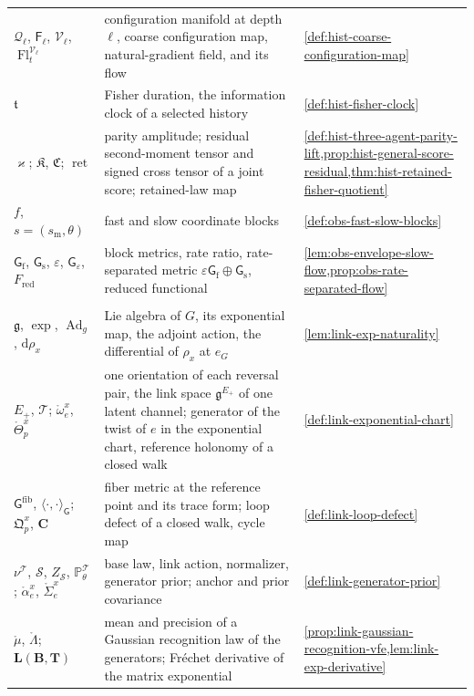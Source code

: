 {\begin{longtable}{@{}>{\raggedright\arraybackslash}p{}
>{\raggedright\arraybackslash}p{}
>{\raggedright\arraybackslash}p{}@{}}
$\mathcal Q_\ell$, $\mathsf F_\ell$, $\mathscr V_\ell$, $\operatorname{Fl}^{\mathscr V_\ell}_t$ & configuration manifold at depth $\ell$, coarse configuration map, natural-gradient field, and its flow & \cref{def:hist-coarse-configuration-map} \\
$\mathfrak t$ & Fisher duration, the information clock of a selected history & \cref{def:hist-fisher-clock} \\
$\varkappa$; $\mathfrak K$, $\mathfrak C$; $\operatorname{ret}$ & parity amplitude; residual second-moment tensor and signed cross tensor of a joint score; retained-law map & \cref{def:hist-three-agent-parity-lift,prop:hist-general-score-residual,thm:hist-retained-fisher-quotient} \\
$f$, $s=(s_{\mathrm m},\theta)$ & fast and slow coordinate blocks & \cref{def:obs-fast-slow-blocks} \\
$\mathsf G_{\mathrm f}$, $\mathsf G_{\mathrm s}$, $\varepsilon$, $\mathsf G_\varepsilon$, $F_{\mathrm{red}}$ & block metrics, rate ratio, rate-separated metric $\varepsilon\mathsf G_{\mathrm f}\oplus\mathsf G_{\mathrm s}$, reduced functional & \cref{lem:obs-envelope-slow-flow,prop:obs-rate-separated-flow} \\
\multicolumn{3}{@{}l}{\textbf{Lie-algebra links}} \\
$\mathfrak g$, $\exp$, $\operatorname{Ad}_g$, $\mathrm d\rho_x$ & Lie algebra of $G$, its exponential map, the adjoint action, the differential of $\rho_x$ at $e_G$ & \cref{lem:link-exp-naturality} \\
$E_+$, $\mathscr T$; $\mathring\omega^x_e$, $\mathring\Theta^x_p$ & one orientation of each reversal pair, the link space $\mathfrak g^{E_+}$ of one latent channel; generator of the twist of $e$ in the exponential chart, reference holonomy of a closed walk & \cref{def:link-exponential-chart} \\
$\mathsf G^{\mathrm{fib}}$, $\langle\cdot,\cdot\rangle_{\mathsf G}$; $\mathfrak Q^x_p$, $\mathbf C$ & fiber metric at the reference point and its trace form; loop defect of a closed walk, cycle map & \cref{def:link-loop-defect} \\
$\nu^{\mathscr T}$, $\mathscr S$, $Z_{\mathscr S}$, $\mathbb P^{\mathscr T}_\theta$; $\mathring\alpha^x_e$, $\mathring\Sigma^x_e$ & base law, link action, normalizer, generator prior; anchor and prior covariance & \cref{def:link-generator-prior} \\
$\mathring\mu$, $\mathring\Lambda$; $\mathbf L(\mathbf B,\mathbf T)$ & mean and precision of a Gaussian recognition law of the generators; Fr\'echet derivative of the matrix exponential & \cref{prop:link-gaussian-recognition-vfe,lem:link-exp-derivative} \\

\end{longtable}}
